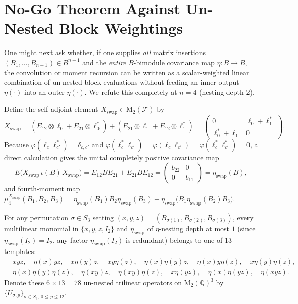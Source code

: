 \documentclass[11pt,a4paper]{article}
\theoremstyle{definition}
\newcommand{\Mat}{\mathrm{M}}
\begin{document}
\section{No-Go Theorem Against Un-Nested Block Weightings}\label{sec:nogo}

One might next ask whether, if one supplies \emph{all} matrix insertions $(B_1, \dots, B_{n-1}) \in B^{n-1}$ and the \emph{entire} $B$-bimodule covariance map $\eta \colon B \to B$, the convolution or moment recursion can be written as a scalar-weighted linear combination of un-nested block evaluations without feeding an inner output $\eta(\cdot)$ into an outer $\eta(\cdot)$. We refute this completely at $n = 4$ (nesting depth $2$).

Define the self-adjoint element $X_{\mathrm{swap}} \in \Mat_2(\mathcal{F})$ by
\[
X_{\mathrm{swap}} = (E_{12} \otimes \ell_0 + E_{21} \otimes \ell_0^*) + (E_{21} \otimes \ell_1 + E_{12} \otimes \ell_1^*)
= \begin{pmatrix} 0 & \ell_0 + \ell_1^* \\ \ell_0^* + \ell_1 & 0 \end{pmatrix}.
\]
Because $\varphi(\ell_c \ell_{c'}^*) = \delta_{c,c'}$ and $\varphi(\ell_c^* \ell_{c'}) = \varphi(\ell_c \ell_{c'}) = \varphi(\ell_c^* \ell_{c'}^*) = 0$, a direct calculation gives the unital completely positive covariance map
\begin{equation}\label{eq:eta-swap}
E\bigl(X_{\mathrm{swap}}\, \iota(B)\, X_{\mathrm{swap}}\bigr) = E_{12} B E_{21} + E_{21} B E_{12} = \begin{pmatrix} b_{22} & 0 \\ 0 & b_{11} \end{pmatrix} = \eta_{\mathrm{swap}}(B),
\end{equation}
and fourth-moment map $\mu_4^{X_{\mathrm{swap}}}(B_1, B_2, B_3) = \eta_{\mathrm{swap}}(B_1) B_2 \eta_{\mathrm{swap}}(B_3) + \eta_{\mathrm{swap}}\bigl(B_1 \eta_{\mathrm{swap}}(B_2) B_3\bigr)$.

For any permutation $\sigma \in S_3$ setting $(x, y, z) = (B_{\sigma(1)}, B_{\sigma(2)}, B_{\sigma(3)})$, every multilinear monomial in $\{x, y, z, I_2\}$ and $\eta_{\mathrm{swap}}$ of $\eta$-nesting depth at most $1$ (since $\eta_{\mathrm{swap}}(I_2) = I_2$, any factor $\eta_{\mathrm{swap}}(I_2)$ is redundant) belongs to one of $13$ templates:
\begin{align*}
&xyz,\quad \eta(x)yz,\quad x\eta(y)z,\quad xy\eta(z),\quad \eta(x)\eta(y)z,\quad \eta(x)y\eta(z),\quad x\eta(y)\eta(z),\\
&\eta(x)\eta(y)\eta(z),\quad \eta(xy)z,\quad \eta(xy)\eta(z),\quad x\eta(yz),\quad \eta(x)\eta(yz),\quad \eta(xyz).
\end{align*}
Denote these $6 \times 13 = 78$ un-nested trilinear operators on $\Mat_2(\mathbb{Q})^3$ by $\{U_{\sigma, p}\}_{\sigma \in S_3,\, 0 \le p \le 12}$.
\end{document}
